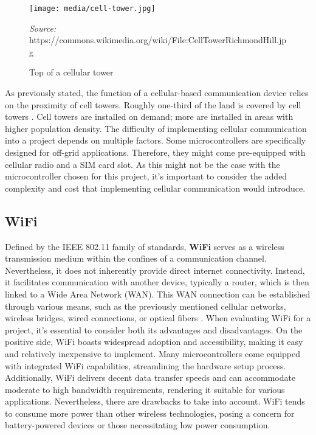 \documentclass[FM,BP,EN,fonts]{tulthesis}
\begin{document}
\begin{figure}[H]
    \centering
    \texttt{[image: media/cell-tower.jpg]}
    \caption{Top of a cellular tower}
    \textit{Source:} https://commons.wikimedia.org/wiki/File:CellTowerRichmondHill.jpg
    \label{fig:cell-tower}
\end{figure}

As previously stated, the function of a cellular-based communication device relies on the proximity of cell towers. Roughly one-third of the land is covered by cell towers \cite{mobile-network-coverage}. Cell towers are installed on demand; more are installed in areas with higher population density. The difficulty of implementing cellular communication into a project depends on multiple factors. Some microcontrollers are specifically designed for off-grid applications. Therefore, they might come pre-equipped with cellular radio and a SIM card slot. As this might not be the case with the microcontroller chosen for this project, it's important to consider the added complexity and cost that implementing cellular communication would introduce.

\subsection{WiFi}
Defined by the IEEE 802.11 family of standards, \textbf{WiFi} serves as a wireless transmission medium within the confines of a communication channel. Nevertheless, it does not inherently provide direct internet connectivity. Instead, it facilitates communication with another device, typically a router, which is then linked to a Wide Area Network (WAN). This WAN connection can be established through various means, such as the previously mentioned cellular networks, wireless bridges, wired connections, or optical fibers \cite{what-is-wifi}. When evaluating WiFi for a project, it's essential to consider both its advantages and disadvantages. On the positive side, WiFi boasts widespread adoption and accessibility, making it easy and relatively inexpensive to implement. Many microcontrollers come equipped with integrated WiFi capabilities, streamlining the hardware setup process. Additionally, WiFi delivers decent data transfer speeds and can accommodate moderate to high bandwidth requirements, rendering it suitable for various applications. Nevertheless, there are drawbacks to take into account. WiFi tends to consume more power than other wireless technologies, posing a concern for battery-powered devices or those necessitating low power consumption.
\end{document}
